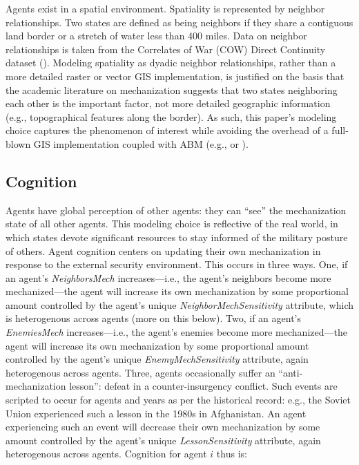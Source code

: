 \documentclass{article}
\begin{document}
Agents exist in a spatial environment. Spatiality is represented by neighbor
relationships. Two states are defined as
being neighbors if they share a contiguous land border or a stretch of water
less than 400 miles. Data on neighbor relationships is taken from the Correlates
of War (COW) Direct Continuity dataset (\cite{cow_contiguity}).
Modeling spatiality as dyadic neighbor relationships, rather than a more
detailed raster or vector GIS implementation, is justified on the basis that the
academic literature on mechanization suggests that two states neighboring each
other is the important factor, not more detailed geographic information (e.g.,
topographical features along the border). As such, this paper's modeling choice
captures the phenomenon of interest while avoiding the overhead of a full-blown
GIS implementation coupled with ABM
(e.g., \cite{harper2002modeling} or \cite{bennett2006modelling}).

\subsection{Cognition}

Agents have global perception of other agents: they can ``see'' the
mechanization state of all other agents. This modeling choice is reflective of
the real world, in which states devote significant resources to stay informed of
the military posture of others. Agent cognition centers on 
updating their own mechanization in response to the external security
environment. This occurs in three ways. One, if an agent's
\textit{NeighborsMech} increases---i.e., the agent's neighbors become more
mechanized---the agent will increase its own mechanization by some proportional
amount controlled by the agent's unique \textit{NeighborMechSensitivity}
attribute, which is heterogenous across agents (more on this below).
Two, if an agent's
\textit{EnemiesMech} increases---i.e., the agent's enemies become more
mechanized---the agent will increase its own mechanization by some proportional
amount controlled by the agent's unique \textit{EnemyMechSensitivity} attribute,
again heterogenous across agents. Three,
agents occasionally suffer an ``anti-mechanization lesson'': defeat in a
counter-insurgency conflict. Such events are scripted to occur for agents and
years as per the historical record: e.g., the Soviet Union experienced such a
lesson in the 1980s in Afghanistan. An agent experiencing such an event will
decrease their own mechanization by some amount controlled by the agent's
unique \textit{LessonSensitivity} attribute, again heterogenous across agents.
Cognition for agent $i$ thus is:
\end{document}
